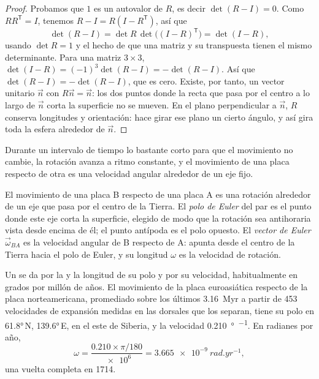 \begin{proof}
Probamos que $1$ es un autovalor de $R$, es decir $\det(R - I) = 0$. Como $R R^{\mathsf T} = I$, tenemos $R - I = R(I - R^{\mathsf T})$,
así que
\[
  \det(R - I) = \det R\,\det\bigl((I - R)^{\mathsf T}\bigr) = \det(I - R),
\]
usando $\det R = 1$ y el hecho de que una matriz y su transpuesta tienen el mismo determinante. Para una matriz $3\times3$,
$\det(I - R) = (-1)^3\det(R - I) = -\det(R - I)$. Así que $\det(R - I) =
-\det(R - I)$, que es cero. Existe, por tanto, un vector unitario $\vec n$ con $R\vec n = \vec n$: los dos puntos donde la recta que
pasa por el centro a lo largo de $\vec n$ corta la superficie no se mueven. En el plano perpendicular a $\vec n$, $R$ conserva
longitudes y orientación: hace girar ese plano un cierto ángulo, y así gira toda la esfera alrededor de $\vec n$.
\end{proof}

Durante un intervalo de tiempo lo bastante corto para que el movimiento no cambie, la rotación avanza a ritmo constante, y el movimiento
de una placa respecto de otra es una velocidad angular alrededor de un eje fijo.

\begin{definition}\label{def:b1:plate-kinematics:euler-pole}
El movimiento de una placa B respecto de una placa A es una rotación alrededor de un eje que pasa por el centro de la Tierra. El
\emph{polo de Euler} del par es el punto donde este eje corta la superficie, elegido de modo que la rotación sea
antihoraria vista desde encima de él; el punto antípoda es el polo opuesto. El \emph{vector de Euler}
$\vec\omega_{BA}$ es la velocidad angular de B respecto de A: apunta desde el centro de la Tierra hacia el polo de Euler, y su longitud
$\omega$ es la velocidad de rotación.
\end{definition}

Un  se da por la  y la longitud de su polo y por su velocidad, habitualmente en grados por millón de años. El
movimiento de la placa euroasiática respecto de la placa norteamericana, promediado sobre los últimos \qty{3.16}{Myr} a partir de 453
velocidades de expansión medidas en las dorsales que los separan, tiene su polo en \ang{61.8}\,N, \ang{139.6}\,E, en el este de Siberia,
y la velocidad \qty{0.210}{\degree\per\Myr}. En radianes por año,
\[
  \omega = \frac{0.210\times\pi/180}{\num{e6}} = \qty{3.665e-9}{rad.yr^{-1}},
\]
una vuelta completa en \qty{1714}{\Myr}.

